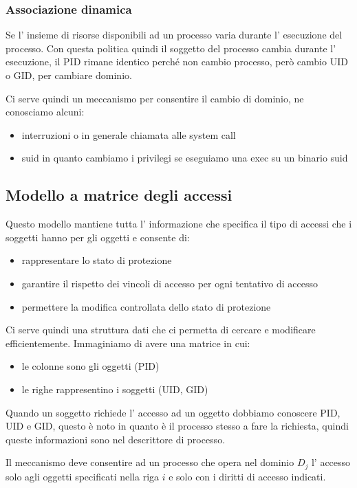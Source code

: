 \subsubsection{Associazione dinamica}
Se l' insieme di risorse disponibili ad un processo varia durante l' esecuzione del processo.
Con questa politica quindi il soggetto del processo cambia durante l' esecuzione, il PID rimane identico perché non cambio processo, però cambio UID o GID, per cambiare dominio.

Ci serve quindi un meccanismo per consentire il cambio di dominio, ne conosciamo alcuni:
\begin{itemize}
    \item interruzioni o in generale chiamata alle system call
    \item suid in quanto cambiamo i privilegi se eseguiamo una exec su un binario suid
\end{itemize}

\subsection{Modello a matrice degli accessi}
Questo modello mantiene tutta l' informazione che specifica il tipo di accessi che i soggetti hanno per gli oggetti e consente di:
\begin{itemize}
    \item rappresentare lo stato di protezione
    \item garantire il rispetto dei vincoli di accesso per ogni tentativo di accesso
    \item permettere la modifica controllata dello stato di protezione
\end{itemize}

Ci serve quindi una struttura dati che ci permetta di cercare e modificare efficientemente.
Immaginiamo di avere una matrice in cui:
\begin{itemize}
    \item le colonne sono gli oggetti (PID)
    \item le righe rappresentino i soggetti (UID, GID)
\end{itemize}

Quando un soggetto richiede l' accesso ad un oggetto dobbiamo conoscere PID, UID e GID, questo è noto in quanto è il processo stesso a fare la richiesta, quindi queste informazioni sono nel descrittore di processo.

Il meccanismo deve consentire ad un processo che opera nel dominio $D_j$ l' accesso solo agli oggetti specificati nella riga $i$ e solo con i diritti di accesso indicati.

